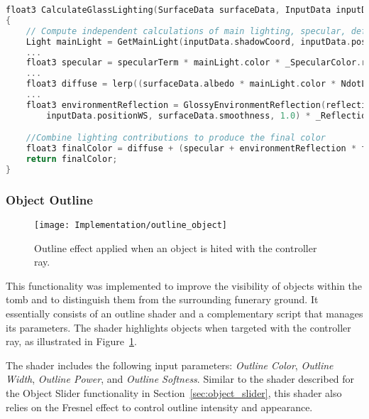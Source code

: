 \begin{lstlisting}[language=C++, caption={Lighting Glass Texture Partial Calculation.}, label={lst:lighting_glass},float]
float3 CalculateGlassLighting(SurfaceData surfaceData, InputData inputData, float fresnel)
{
    // Compute independent calculations of main lighting, specular, defuse, and environment reflection.
    Light mainLight = GetMainLight(inputData.shadowCoord, inputData.positionWS, inputData.shadowMask);
    ...
    float3 specular = specularTerm * mainLight.color * _SpecularColor.rgb * surfaceData.smoothness;
    ...
    float3 diffuse = lerp((surfaceData.albedo * mainLight.color * NdotL * 0.1),surfaceData.albedo, _BlendFactor);
    ...     
    float3 environmentReflection = GlossyEnvironmentReflection(reflectionVector, 
        inputData.positionWS, surfaceData.smoothness, 1.0) * _ReflectionIntensity;

    //Combine lighting contributions to produce the final color
    float3 finalColor = diffuse + (specular + environmentReflection * fresnel);
    return finalColor;
}
\end{lstlisting}

\subsubsection{Object Outline}
\label{sec:object_outline}

 \begin{figure}[h!]
    \centering
    \texttt{[image: Implementation/outline\_object]}
    \caption{Outline effect applied when an object is hited with the controller ray.}
    \label{fig:outline_object}    
\end{figure}


This functionality was implemented to improve the visibility of objects within the tomb and to distinguish them from the surrounding funerary ground.  
It essentially consists of an outline shader and a complementary script that manages its parameters. 
The shader highlights objects when targeted with the controller ray, as illustrated in Figure~\ref{fig:outline_object}.

The shader includes the following input parameters: \emph{Outline Color}, \emph{Outline Width}, \emph{Outline Power}, and \emph{Outline Softness}.  
Similar to the shader described for the Object Slider functionality in Section~\ref{sec:object_slider}, this shader also relies on the Fresnel effect to control outline intensity and appearance.  

